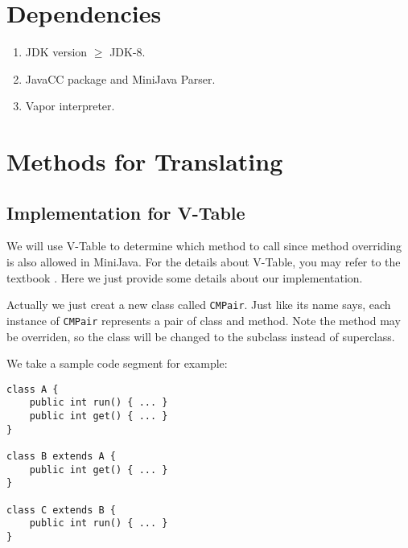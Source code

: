 \documentclass[letterpaper, 14pt]{article}
\begin{document}
\section{Dependencies}

\begin{enumerate}
\item JDK version $\geq$ JDK-8. 
\item JavaCC package and MiniJava Parser. 
\item Vapor interpreter.
\end{enumerate}

\section{Methods for Translating}

\subsection{Implementation for V-Table}

We will use V-Table to determine which method to call since method overriding is also allowed in MiniJava. For the details about V-Table, you may refer to the textbook \cite{book}. Here we just provide some details about our implementation. 

Actually we just creat a new class called \texttt{CMPair}. Just like its name says, each instance of \texttt{CMPair} represents a pair of class and method. Note the method may be overriden, so the class will be changed to the subclass instead of superclass. 

We take a sample code segment for example:
\begin{lstlisting}
class A {
	public int run() { ... }
	public int get() { ... }
}

class B extends A {
	public int get() { ... }
}

class C extends B {
	public int run() { ... }
}
\end{lstlisting}
\end{document}
